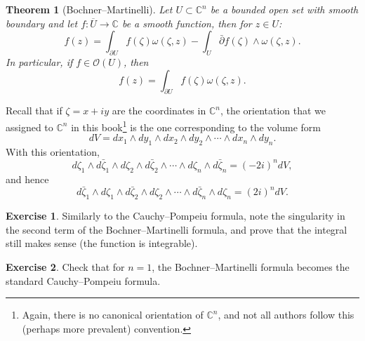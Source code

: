 \documentclass[12pt,openany]{book}
\newcommand{\C}{{\mathbb{C}}}
\newcommand{\sO}{{\mathscr{O}}}
\theoremstyle{plain}
\newtheorem{thm}{Theorem}[section]
\theoremstyle{remark}
\theoremstyle{definition}
\newenvironment{exbox}{%
    \def\FrameCommand{\vrule width 1pt \relax\hspace {10pt}}%
    \MakeFramed {\advance \hsize -\width \FrameRestore }%
}{%
    \endMakeFramed
}
\theoremstyle{exercise}
\newtheorem{exercise}{Exercise}[section]
\theoremstyle{example}
\begin{document}
\begin{thm}[Bochner--Martinelli] \label{thm:bochnermartinelli}
Let $U \subset \C^n$ be a bounded open set with smooth boundary and let
$f \colon \overline{U} \to \C$ be a smooth function,
then for $z \in U$:
\begin{equation*}
f(z) =
\int_{\partial U}
f(\zeta) \omega(\zeta,z)
-
\int_{U}
\bar{\partial} f(\zeta) \wedge \omega(\zeta,z) .
\end{equation*}
In particular, if $f \in \sO(U)$, then
\begin{equation*}
f(z) =
\int_{\partial U}
f(\zeta) \omega(\zeta,z) .
\end{equation*}
\end{thm}

Recall that if $\zeta = x+iy$ are the coordinates in $\C^n$, the orientation that we assigned to $\C^n$ in
this book\footnote{Again, there is
no canonical orientation of $\C^n$, and
not all authors follow this (perhaps more prevalent) convention.}
is the one corresponding to the volume form
%
\begin{equation*}
dV = dx_1 \wedge dy_1 \wedge dx_2 \wedge dy_2 \wedge \cdots \wedge dx_n \wedge dy_n .
\end{equation*}
With this orientation,
\begin{equation*}
d\zeta_1 \wedge d\bar{\zeta}_1 \wedge
d\zeta_2 \wedge d\bar{\zeta}_2 \wedge
\cdots \wedge
d\zeta_n \wedge d\bar{\zeta}_n = {(-2i)}^n dV ,
\end{equation*}
and hence
\begin{equation*}
d\bar{\zeta}_1 \wedge d\zeta_1 \wedge
d\bar{\zeta}_2 \wedge d\zeta_2 \wedge
\cdots \wedge
d\bar{\zeta}_n \wedge d\zeta_n = {(2i)}^n dV .
\end{equation*}

\begin{exbox}
\begin{exercise}
Similarly to the Cauchy--Pompeiu formula,
note the singularity in the second term of the Bochner--Martinelli formula,
and prove that the integral still makes
sense (the function is integrable).
\end{exercise}

\begin{exercise}
Check that for $n=1$, the Bochner--Martinelli formula
becomes the standard Cauchy--Pompeiu formula.
\end{exercise}
\end{exbox}
\end{document}
